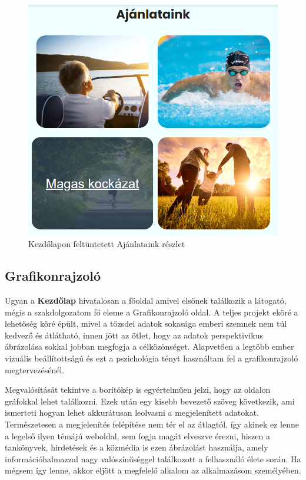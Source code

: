 \begin{figure}[h]
\centering
\includegraphics[scale=0.4]{images/home.png}
\caption{Kezdőlapon feltüntetett Ajánlataink részlet}
\end{figure}

\subsection{Grafikonrajzoló}

Ugyan a \textbf{Kezdőlap} hivatalosan a főoldal amivel elsőnek találkozik a látogató, mégis a szakdolgozatom fő eleme a Grafikonrajzoló oldal. A teljes projekt eköré a lehetőség köré épült, mivel a tőzsdei adatok sokasága emberi szemnek nem túl kedvező és átlátható, innen jött az ötlet, hogy az adatok perspektivikus ábrázolása sokkal jobban megfogja a célközönséget. Alapvetően a legtöbb ember vizuális beállítottságú és ezt a pszichológia tényt használtam fel a grafikonrajzoló megtervezésénél.

	Megvalósítását tekintve a borítókép is egyértelműen jelzi, hogy az oldalon gráfokkal lehet találkozni. Ezek után egy kisebb bevezető szöveg következik, ami ismerteti hogyan lehet akkurátusan leolvasni a megjelenített adatokat. Természetesen a megjelenítés felépítése nem tér el az átlagtól, így akinek ez lenne a legelső ilyen témájú weboldal, sem fogja magát elveszve érezni, hiszen a tankönyvek, hirdetések és a közmédia is ezen ábrázolást használja, amely információhalmazzal nagy valószínűséggel találkozott a felhasználó élete során. Ha mégsem így lenne, akkor eljött a megfelelő alkalom az alkalmazásom személyében.

